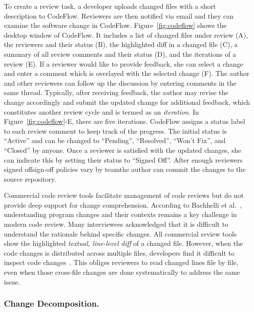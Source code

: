 To create a review task, a developer uploads changed files with a short description to CodeFlow. Reviewers are then notified via email and they can examine the software change in CodeFlow. Figure~\ref{fig:codeflow} shows the desktop window of CodeFlow. It includes a list of changed files under review (A), the reviewers and their status (B), the highlighted diff in a changed file (C), a summary of all review comments and their status (D), and the iterations of a review (E). If a reviewer would like to provide feedback, she can select a change and enter a comment which is overlayed with the selected change (F). The author and other reviewers can follow up the discussion by entering comments in the same thread. Typically, after receiving feedback, the author may revise the change accordingly and submit the updated change for additional feedback, which constitutes another review cycle and is termed as an {\em iteration}. In Figure~\ref{fig:codeflow}-E, there are five iterations. CodeFlow assigns a status label to each review comment to keep track of the progress. The initial status is ``Active'' and can be changed to ``Pending'', ``Resolved'', ``Won't Fix'', and ``Closed'' by anyone. Once a reviewer is satisfied with the updated changes, she can indicate this by setting their status to ``Signed Off''. After enough reviewers signed off\textemdash sign-off policies vary by team\textemdash the author can commit the changes to the source repository.

Commercial code review tools facilitate management of code reviews but do not provide deep support for change comprehension. According to Bachhelli et al.~\cite{bacchelli2013expectations}, understanding program changes and their contexts remains a key challenge in modern code review. Many interviewees acknowledged that it is difficult to understand the rationale behind specific changes. All commercial review tools show the highlighted {\em textual, line-level diff} of a changed file. However, when the code changes is distributed across multiple files, developers find it difficult to inspect code changes~\cite{Dunsmore2000:ooinspection}. This obliges reviewers to read changed lines file by file, even when those cross-file changes are done systematically to address the same issue. 
\subsubsection{Change Decomposition.}
\label{sec:decomposition} 

